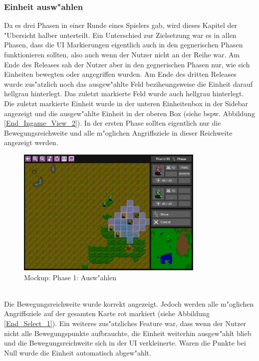 \documentclass[12pt, titlepage]{scrartcl}
\newcounter{subsubsubsection}[subsubsection]
\begin{document}
			\subsubsection{Einheit ausw"ahlen} \label{END_SELECT}
				Da es drei Phasen in einer Runde eines Spielers gab, wird dieses Kapitel der "Ubersicht halber unterteilt. Ein Unterschied zur Zielsetzung war es in allen Phasen, dass die UI Markierungen eigentlich auch in den gegnerischen Phasen funktionieren sollten, also auch wenn der Nutzer nicht an der Reihe war. Am Ende des Releases sah der Nutzer aber in den gegnerischen Phasen nur, wie sich Einheiten bewegten oder angegriffen wurden. Am Ende des dritten Releases wurde zus"atzlich noch das ausgew"ahlte Feld beziheungsweise die Einheit darauf hellgrau hinterlegt. Das zuletzt markierte Feld wurde auch hellgrau hinterlegt. Die zuletzt markierte Einheit wurde in der unteren Einheitenbox in der Sidebar angezeigt und die ausgew"ahlte Einheit in der oberen Box (siehe bspw. Abbildung \ref{End_Ingame_View_2}).
					In der ersten Phase sollten eigentlich nur die Bewegungsreichweite und alle m"oglichen Angriffsziele in dieser Reichweite angezeigt werden.
					\begin{figure}[H] 
						\centering
						\includegraphics[width=0.8\textwidth]{images/mockups/Select.png}
						\caption{Mockup: Phase 1: Ausw"ahlen}
						\label{Select_1_2}
					\end{figure}
					\ \\ Die Bewegungsreichweite wurde korrekt angezeigt. Jedoch werden alle m"oglichen Angriffsziele auf der gesamten Karte rot markiert (siehe Abbildung \ref{End_Select_1}). Ein weiteres zus"atzliches Feature war, dass wenn der Nutzer nicht alle Bewegungspunkte aufbrauchte, die Einheit weiterhin ausgew"ahlt blieb und die Bewegungsreichweite sich in der UI verkleinerte. Waren die Punkte bei Null wurde die Einheit automatisch abgew"ahlt.
\end{document}
